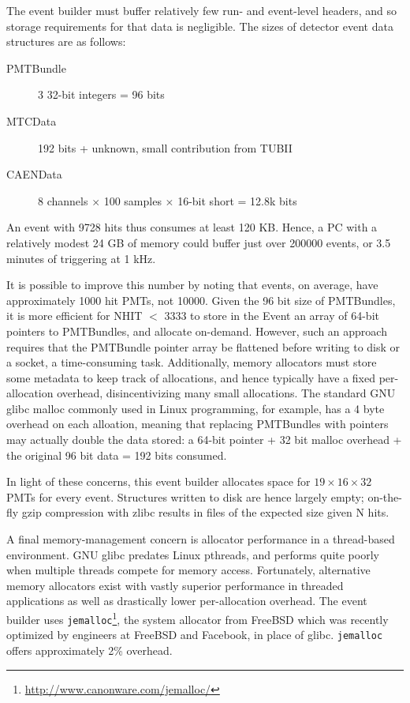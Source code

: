 \documentclass[11pt,twocolumn]{article}
\begin{document}
The event builder must buffer relatively few run- and event-level headers, and so storage requirements for that data is negligible. The sizes of detector event data structures are as follows:
\begin{description}
\item[PMTBundle] 3 32-bit integers = 96 bits
\item[MTCData] 192 bits + unknown, small contribution from TUBII
\item[CAENData] 8 channels $\times$ 100 samples $\times$ 16-bit short = 12.8k bits
\end{description}
An event with 9728 hits thus consumes at least 120 KB. Hence, a PC with a relatively modest 24 GB of memory could buffer just over 200000 events, or 3.5 minutes of triggering at 1 kHz.

It is possible to improve this number by noting that events, on average, have approximately 1000 hit PMTs, not 10000. Given the 96 bit size of PMTBundles, it is more efficient for NHIT $<$ 3333 to store in the Event an array of 64-bit pointers to PMTBundles, and allocate on-demand. However, such an approach requires that the PMTBundle pointer array be flattened before writing to disk or a socket, a time-consuming task. Additionally, memory allocators must store some metadata to keep track of allocations, and hence typically have a fixed per-allocation overhead, disincentivizing many small allocations. The standard GNU glibc malloc commonly used in Linux programming, for example, has a 4 byte overhead on each alloation, meaning that replacing PMTBundles with pointers may actually double the data stored: a 64-bit pointer + 32 bit malloc overhead + the original 96 bit data = 192 bits consumed.

In light of these concerns, this event builder allocates space for $19\times16\times32$ PMTs for every event. Structures written to disk are hence largely empty; on-the-fly gzip compression with zlibc results in files of the expected size given N hits.

A final memory-management concern is allocator performance in a thread-based environment. GNU glibc predates Linux pthreads, and performs quite poorly when multiple threads compete for memory access. Fortunately, alternative memory allocators exist with vastly superior performance in threaded applications as well as drastically lower per-allocation overhead. The event builder uses {\tt jemalloc}\footnote{\href{http://www.canonware.com/jemalloc/}{http://www.canonware.com/jemalloc/}}, the system allocator from FreeBSD which was recently optimized by engineers at FreeBSD and Facebook, in place of glibc. {\tt jemalloc} offers approximately 2\% overhead.
\end{document}
